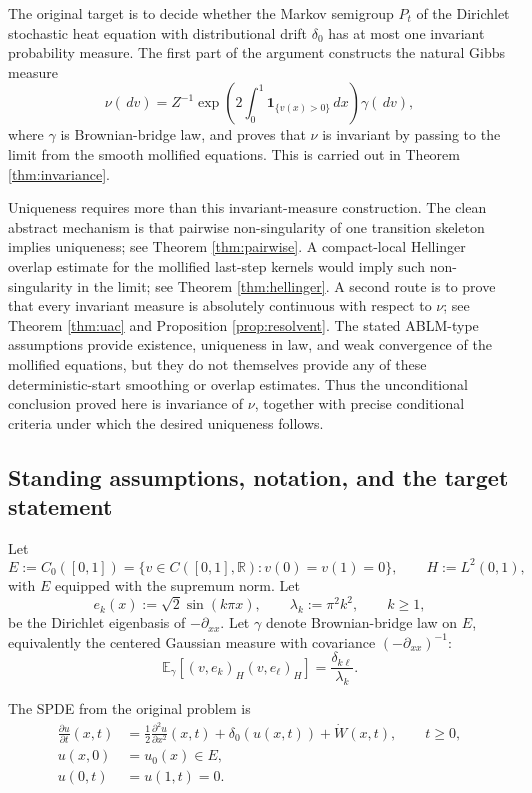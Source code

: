 \documentclass[12pt]{article}
\newcommand{\R}{\mathbb R}
\newcommand{\E}{\mathbb E}
\newcommand{\1}{\mathbf 1}
\newcommand{\dd}{\,d}
\theoremstyle{plain}
\theoremstyle{definition}
\theoremstyle{remark}
\numberwithin{equation}{section}
\begin{document}
The original target is to decide whether the Markov semigroup \(P_t\) of the
Dirichlet stochastic heat equation with distributional drift \(\delta_0\) has
at most one invariant probability measure.  The first part of the argument
constructs the natural Gibbs measure
\[
\nu(\dd v)=Z^{-1}\exp\!\left(2\int_0^1\1_{\{v(x)>0\}}\dd x\right)\gamma(\dd v),
\]
where \(\gamma\) is Brownian-bridge law, and proves that \(\nu\) is invariant by
passing to the limit from the smooth mollified equations.  This is carried out
in Theorem \ref{thm:invariance}.

Uniqueness requires more than this invariant-measure construction.  The clean
abstract mechanism is that pairwise non-singularity of one transition skeleton
implies uniqueness; see Theorem \ref{thm:pairwise}.  A compact-local Hellinger
overlap estimate for the mollified last-step kernels would imply such
non-singularity in the limit; see Theorem \ref{thm:hellinger}.  A second route is
to prove that every invariant measure is absolutely continuous with respect to
\(\nu\); see Theorem \ref{thm:uac} and Proposition \ref{prop:resolvent}.  The
stated ABLM-type assumptions provide existence, uniqueness in law, and weak
convergence of the mollified equations, but they do not themselves provide any
of these deterministic-start smoothing or overlap estimates.  Thus the
unconditional conclusion proved here is invariance of \(\nu\), together with
precise conditional criteria under which the desired uniqueness follows.

\subsection{Standing assumptions, notation, and the target statement}

Let
\[
E:=C_0([0,1])
=\{v\in C([0,1],\R):v(0)=v(1)=0\},
\qquad H:=L^2(0,1),
\]
with \(E\) equipped with the supremum norm.  Let
\[
e_k(x):=\sqrt2\sin(k\pi x),\qquad \lambda_k:=\pi^2k^2,\qquad k\ge1,
\]
be the Dirichlet eigenbasis of \(-\partial_{xx}\).  Let \(\gamma\) denote
Brownian-bridge law on \(E\), equivalently the centered Gaussian measure with
covariance \((-\partial_{xx})^{-1}\):
\[
\E_\gamma[(v,e_k)_H(v,e_\ell)_H]=\frac{\delta_{k\ell}}{\lambda_k}.
\]

The SPDE from the original problem is
\begin{align}
\tag{\(*\)}\label{eq:spde}
\frac{\partial u}{\partial t}(x,t)
&=\frac12\frac{\partial^2u}{\partial x^2}(x,t)
+\delta_0(u(x,t))+\dot W(x,t),\qquad t\ge0,\\
u(x,0)&=u_0(x)\in E,\nonumber\\
u(0,t)&=u(1,t)=0.\nonumber
\end{align}
\end{document}

